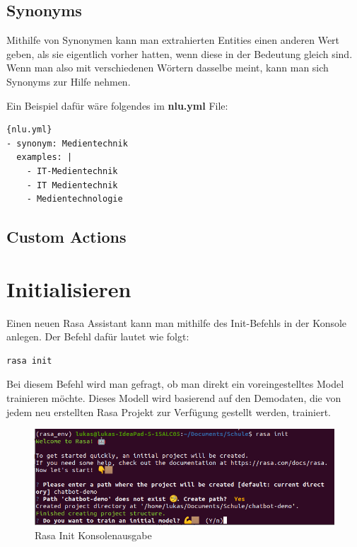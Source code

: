 \subsection{Synonyms}

Mithilfe von Synonymen kann man extrahierten Entities einen anderen Wert geben, als sie eigentlich vorher hatten, wenn diese in der Bedeutung gleich sind.
Wenn man also mit verschiedenen Wörtern dasselbe meint, kann man sich Synonyms zur Hilfe nehmen.\cite{synonyms}

Ein Beispiel dafür wäre folgendes im \textbf{nlu.yml} File:

\begin{lstlisting}[label={lst: Synonym Example}]{nlu.yml}
- synonym: Medientechnik
  examples: |
    - IT-Medientechnik
    - IT Medientechnik
    - Medientechnologie
\end{lstlisting}

\subsection{Custom Actions}

\section{Initialisieren}

Einen neuen Rasa Assistant kann man mithilfe des Init-Befehls in der Konsole anlegen.
Der Befehl dafür lautet wie folgt:

\begin{lstlisting}[label={lst: Rasa Train}]
rasa init
\end{lstlisting}

Bei diesem Befehl wird man gefragt, ob man direkt ein voreingestelltes Model trainieren möchte.
Dieses Modell wird basierend auf den Demodaten, die von jedem neu erstellten Rasa Projekt zur Verfügung gestellt werden, trainiert.

\begin{figure}[hbt!]
  \centering
  \includegraphics[scale=0.25]{pics/rasa_init}
  \caption{Rasa Init Konsolenausgabe}
  \label{fig:rasa_init}
\end{figure}

